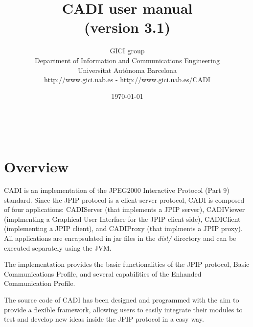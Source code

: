 \documentclass[a4paper,10pt]{article}
\title{CADI user manual \\ \small (version 3.1)}
\author{
GICI group \vspace{0.1cm} \\
\small Department of Information and Communications Engineering \\
\small Universitat Aut{\`o}noma Barcelona \\
\small http://www.gici.uab.es  -  http://www.gici.uab.es/CADI \\
}
\date{\today}
\begin{document}
\maketitle
\begin{figure}
	\centering
 	\hspace*{0.2\textwidth}
 	~
 	\hspace*{0.2\textwidth}
 	~
\end{figure}
\thispagestyle{empty}
\newpage

\tableofcontents
\newpage


\section{Overview}
\label{sect:overview}

CADI is an implementation of the JPEG2000 Interactive Protocol (Part 9) standard.
Since the JPIP protocol is a client-server protocol, CADI is composed of four
applications: CADIServer (that implements a JPIP server), CADIViewer (implmenting
a Graphical User Interface for the JPIP client side), CADIClient (implementing
a JPIP client), and CADIProxy (that implments a JPIP proxy). All applications
are encapsulated in jar files in the \emph{dist/} directory and can be executed
separately using the JVM. 

The implementation provides the basic functionalities of the JPIP protocol, Basic
Communications Profile, and several capabilities of the Enhanded  Communication
Profile.
 
The source code of CADI has been designed and programmed with the aim to provide
a flexible framework, allowing users to easily integrate their modules to test
and develop new ideas inside the JPIP protocol in a easy way.
\end{document}
